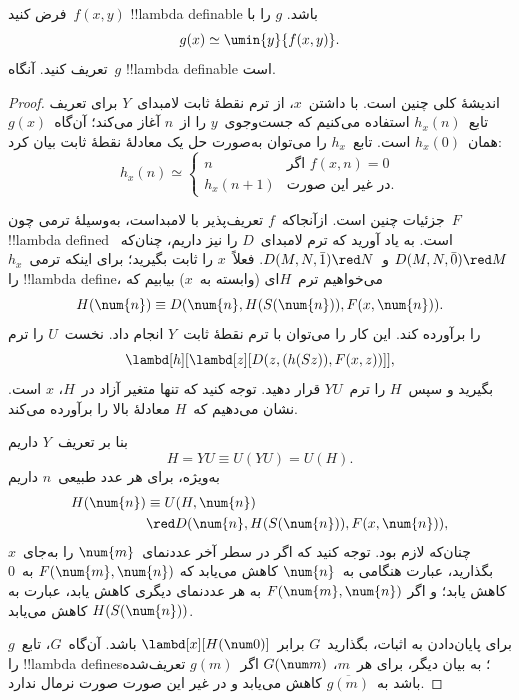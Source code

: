\documentclass[../../../include/open-logic-section]{subfiles}
\begin{document}

\begin{lem}
فرض کنید~$f(x,y)$ !!{lambda definable} باشد. $g$ را با
\[
g(x) \simeq \umin{y}{f(x,y)}.
\]
تعریف کنید. آنگاه~$g$ !!{lambda definable} است.
\end{lem}

\begin{proof}
اندیشهٔ کلی چنین است. با داشتن~$x$، از ترم نقطهٔ ثابت لامبدای~$Y$ برای
تعریف تابع~$h_x(n)$ استفاده می‌کنیم که جست‌وجوی~$y$ را از~$n$ آغاز
می‌کند؛ آن‌گاه~$g(x)$ همان~$h_x(0)$ است. تابع~$h_x$ را می‌توان به‌صورت
حل یک معادلهٔ نقطهٔ ثابت بیان کرد:
\[
h_x(n) \simeq
\begin{cases}
n & \text{اگر $f(x,n) = 0$} \\
h_x(n+1) & \text{در غیر این صورت.}
\end{cases}
\]

جزئیات چنین است. ازآنجاکه~$f$ تعریف‌پذیر با لامبداست، به‌وسیلهٔ ترمی
چون~$F$ !!{lambda defined} است. به یاد آورید که ترم لامبدای~$D$ را نیز
داریم، چنان‌که~$D(M, N, \bar{0}) \red M$ و~$D(M, N, \bar{1}) \red N$.
فعلاً~$x$ را ثابت بگیرید؛ برای اینکه ترمی~$h_x$ را !!{lambda define}،
می‌خواهیم ترم~$H$ای (وابسته به~$x$) بیابیم که
\[
H(\num{n}) \equiv D(\num{n}, H(S(\num{n})), F(x, \num{n})).
\]
را برآورده کند. این کار را می‌توان با ترم نقطهٔ ثابت~$Y$ انجام داد.
نخست~$U$ را ترم
\[
\lambd[h][\lambd[z][D(z,(h(Sz)),F(x,z))]],
\]
بگیرید و سپس~$H$ را ترم~$YU$ قرار دهید. توجه کنید که تنها متغیر آزاد
در~$H$، $x$ است. نشان می‌دهیم که~$H$ معادلهٔ بالا را برآورده می‌کند.

بنا بر تعریف~$Y$ داریم
\[
H = YU \equiv U(YU) = U(H).
\]
به‌ویژه، برای هر عدد طبیعی~$n$ داریم
\begin{align*}
H(\num{n}) & \equiv U(H, \num{n}) \\
& \red D(\num{n}, H(S(\num{n})), F(x, \num{n})),
\end{align*}
چنان‌که لازم بود. توجه کنید که اگر در سطر آخر عددنمای~$\num{m}$ را
به‌جای~$x$ بگذارید، عبارت هنگامی به~$\num{n}$ کاهش می‌یابد که
$F(\num{m}, \num{n})$ به~$\num{0}$ کاهش یابد؛ و اگر
$F(\num{m}, \num{n})$ به هر عددنمای دیگری کاهش یابد، عبارت به
$H(S(\num{n}))$ کاهش می‌یابد.

برای پایان‌دادن به اثبات، بگذارید~$G$ برابر~$\lambd[x][H(\num 0)]$ باشد.
آن‌گاه~$G$، تابع~$g$ را !!{lambda define}s؛ به بیان دیگر، برای هر~$m$،
$G(\num m)$ اگر~$g(m)$ تعریف‌شده باشد به~$\overline {g(m)}$ کاهش می‌یابد
و در غیر این صورت صورت نرمال ندارد.
\end{proof}
\end{document}

